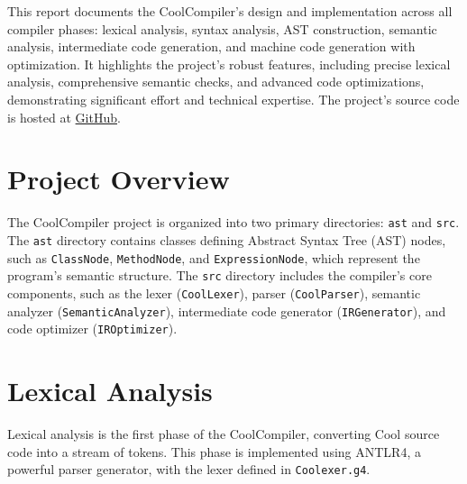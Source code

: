 \documentclass[12pt]{article}
\begin{document}
This report documents the CoolCompiler’s design and implementation across all compiler phases: lexical analysis, syntax analysis, AST construction, semantic analysis, intermediate code generation, and machine code generation with optimization. It highlights the project’s robust features, including precise lexical analysis, comprehensive semantic checks, and advanced code optimizations, demonstrating significant effort and technical expertise. The project’s source code is hosted at \href{https://github.com/WesamElRaghy/CoolCompiler/tree/main}{GitHub}.

\section{Project Overview}
The CoolCompiler project is organized into two primary directories: \texttt{ast} and \texttt{src}. The \texttt{ast} directory contains classes defining Abstract Syntax Tree (AST) nodes, such as \texttt{ClassNode}, \texttt{MethodNode}, and \texttt{ExpressionNode}, which represent the program’s semantic structure. The \texttt{src} directory includes the compiler’s core components, such as the lexer (\texttt{CoolLexer}), parser (\texttt{CoolParser}), semantic analyzer (\texttt{SemanticAnalyzer}), intermediate code generator \newline (\texttt{IRGenerator}), and code optimizer (\texttt{IROptimizer}).

\section{Lexical Analysis}
Lexical analysis is the first phase of the CoolCompiler, converting Cool source code into a stream of tokens. This phase is implemented using ANTLR4, a powerful parser generator, with the lexer defined in \texttt{Coolexer.g4}.
\end{document}
